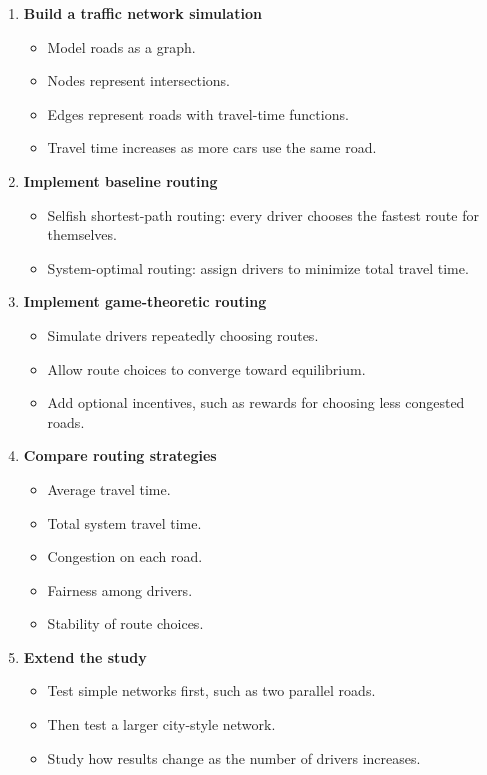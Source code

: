 \documentclass[11pt,a4paper]{article}
\begin{document}
\begin{enumerate}
    \item \textbf{Build a traffic network simulation}
    \begin{itemize}
        \item Model roads as a graph.
        \item Nodes represent intersections.
        \item Edges represent roads with travel-time functions.
        \item Travel time increases as more cars use the same road.
    \end{itemize}

    \item \textbf{Implement baseline routing}
    \begin{itemize}
        \item Selfish shortest-path routing: every driver chooses the fastest route for themselves.
        \item System-optimal routing: assign drivers to minimize total travel time.
    \end{itemize}

    \item \textbf{Implement game-theoretic routing}
    \begin{itemize}
        \item Simulate drivers repeatedly choosing routes.
        \item Allow route choices to converge toward equilibrium.
        \item Add optional incentives, such as rewards for choosing less congested roads.
    \end{itemize}

    \item \textbf{Compare routing strategies}
    \begin{itemize}
        \item Average travel time.
        \item Total system travel time.
        \item Congestion on each road.
        \item Fairness among drivers.
        \item Stability of route choices.
    \end{itemize}

    \item \textbf{Extend the study}
    \begin{itemize}
        \item Test simple networks first, such as two parallel roads.
        \item Then test a larger city-style network.
        \item Study how results change as the number of drivers increases.
    \end{itemize}
\end{enumerate}
\end{document}
